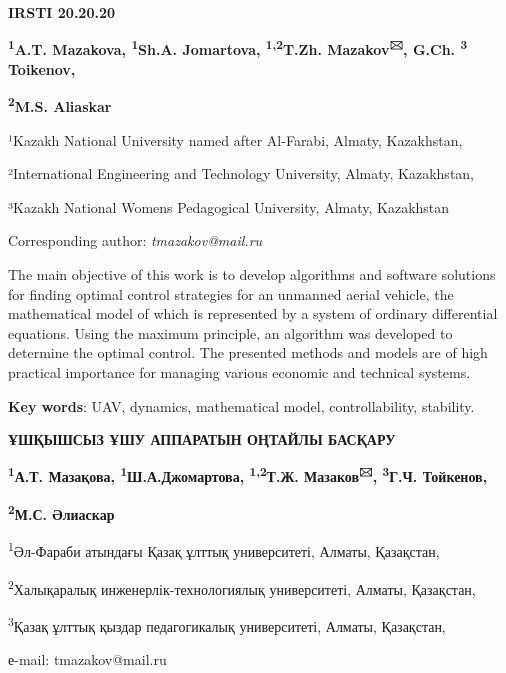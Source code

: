 
\newpage
{\bfseries IRSTI 20.20.20}


\begin{center}

{\bfseries \textsuperscript{1}A.T. Mazakova, \textsuperscript{1}Sh.A.
Jomartova, \textsuperscript{1,2}T.Zh. Mazakov\textsuperscript{🖂}, G.Ch.
\textsuperscript{3} Toikenov,}

{\bfseries \textsuperscript{2}M.S. Aliaskar}

¹Kazakh National University named after Al-Farabi, Almaty, Kazakhstan,

²International Engineering and Technology University, Almaty,
Kazakhstan,

³Kazakh National Women\textquotesingle s Pedagogical University, Almaty,
Kazakhstan

Corresponding author: \emph{ tmazakov@mail.ru}
\end{center}

The main objective of this work is to develop algorithms and software
solutions for finding optimal control strategies for an unmanned aerial
vehicle, the mathematical model of which is represented by a system of
ordinary differential equations. Using the maximum principle, an
algorithm was developed to determine the optimal control. The presented
methods and models are of high practical importance for managing various
economic and technical systems.

{\bfseries Key words}: UAV, dynamics, mathematical model, controllability,
stability.
\begin{center}

{\bfseries ҰШҚЫШСЫЗ ҰШУ АППАРАТЫН ОҢТАЙЛЫ БАСҚАРУ}

{\bfseries \textsuperscript{1}А.Т. Мазақова,
\textsuperscript{1}Ш.А.Джомартова, \textsuperscript{1,2}Т.Ж.
Мазаков\textsuperscript{🖂}, \textsuperscript{3}Г.Ч. Тойкенов,}

{\bfseries \textsuperscript{2}М.С. Әлиаскар}

\textsuperscript{1}Әл-Фараби атындағы Қазақ ұлттық университеті, Алматы,
Қазақстан,

\textsuperscript{2}Халықаралық инженерлік-технологиялық университеті,
Алматы, Қазақстан,

\textsuperscript{3}Қазақ ұлттық қыздар педагогикалық университеті,
Алматы, Қазақстан,

е-mail: tmazakov@mail.ru
\end{center}


